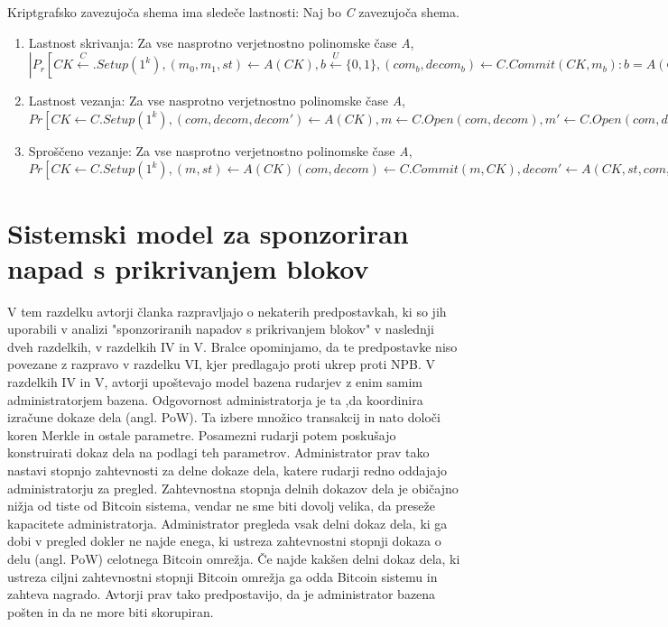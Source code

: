 \documentclass[12pt]{article}
\begin{document}
\newline
\indent Kriptgrafsko zavezujoča shema ima sledeče lastnosti:
\indent Naj bo \textit{C} zavezujoča shema.
\begin{enumerate}
	\item Lastnost skrivanja: Za vse nasprotno verjetnostno polinomske čase \textit{A},
	$|P_r[CK \xleftarrow C.Setup(1^k),(m_0,m_1,st) \leftarrow A(CK), b \xleftarrow{U}  \{0,1\},(com_b, decom_b) \leftarrow C.Commit(CK,m_b) : b = A(CK,st,com_b)] - \frac{1}{2}|  \le negl(k)$
	\item Lastnost vezanja: Za vse nasprotno verjetnostno polinomske čase \textit{A},
	$ Pr[CK \leftarrow C.Setup(1^k),(com,decom,decom') \leftarrow A(CK),m \leftarrow C.Open(com,decom), m' \leftarrow C.Open(com,decom') : m \ne m' \bigwedge m' \ne \bot ] \le negl(k)  $
	\item Sproščeno vezanje: Za vse nasprotno verjetnostno polinomske čase \textit{A},
	$ Pr[CK \leftarrow C.Setup(1^k) , (m,st) \leftarrow A(CK) (com,decom) \leftarrow C.Commit(m,CK), decom' \leftarrow A(CK,st,com,decom'), m \leftarrow C.Open(com,decom') : m \ne m' \bigwedge m' \ne \bot \le negl(k)] $
\end{enumerate}

\section{Sistemski model  za sponzoriran napad s prikrivanjem blokov}

V tem razdelku avtorji članka razpravljajo  o nekaterih predpostavkah, ki so jih uporabili v analizi "sponzoriranih napadov s prikrivanjem blokov" v naslednji dveh razdelkih, v razdelkih IV in V. Bralce opominjamo, da te predpostavke niso povezane z razpravo v razdelku VI, kjer predlagajo proti ukrep proti NPB. V razdelkih IV in V, avtorji upoštevajo model bazena rudarjev z enim samim administratorjem bazena. Odgovornost administratorja je ta ,da koordinira izračune dokaze dela (angl. PoW). Ta izbere množico transakcij in nato določi koren Merkle in ostale parametre. Posamezni rudarji potem poskušajo konstruirati dokaz dela na podlagi teh parametrov. Administrator prav tako nastavi stopnjo zahtevnosti za delne dokaze dela, katere rudarji redno oddajajo administratorju za pregled. Zahtevnostna stopnja delnih dokazov dela je običajno nižja od tiste od Bitcoin sistema, vendar ne sme biti dovolj velika, da preseže kapacitete administratorja. Administrator pregleda vsak delni dokaz dela, ki ga dobi v pregled dokler ne najde enega, ki ustreza zahtevnostni stopnji dokaza o delu (angl. PoW) celotnega Bitcoin omrežja. Če najde kakšen delni dokaz dela, ki ustreza ciljni zahtevnostni stopnji Bitcoin omrežja ga odda Bitcoin sistemu in zahteva nagrado. Avtorji prav tako predpostavijo, da je administrator bazena pošten in da ne more biti skorupiran.
\end{document}

